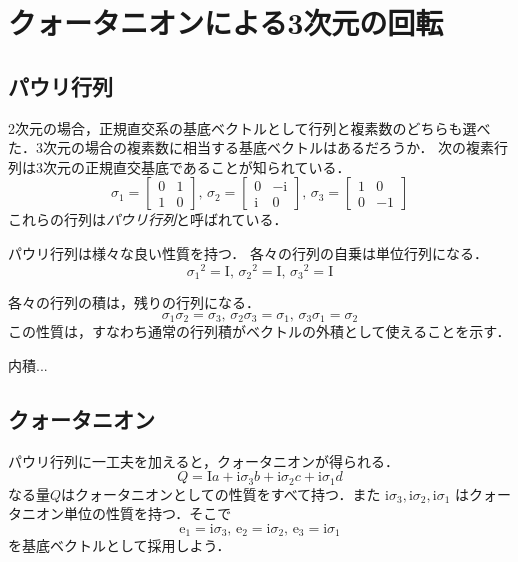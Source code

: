 \documentclass{jsbook}
\newcommand{\keyword}[1]{\emph{#1}}
\newcommand{\One}{\mathrm{I}}%
\newcommand{\im}{\mathrm{i}}%
\newcommand{\ve}{\mathrm{e}}
\begin{document}
\section{クォータニオンによる3次元の回転}

\subsection{パウリ行列}

2次元の場合，正規直交系の基底ベクトルとして行列と複素数のどちらも選べた．3次元の場合の複素数に相当する基底ベクトルはあるだろうか．
次の複素行列は3次元の正規直交基底であることが知られている．
\begin{equation}
\sigma_1=\begin{bmatrix}0&1\\1&0\end{bmatrix},\,
\sigma_2=\begin{bmatrix}0&-\im\\\im&0\end{bmatrix},\,
\sigma_3=\begin{bmatrix}1&0\\0&-1\end{bmatrix}
\end{equation}
これらの行列は\keyword{パウリ行列}と呼ばれている．

パウリ行列は様々な良い性質を持つ．
各々の行列の自乗は単位行列になる．
\begin{equation}
{\sigma_1}^2=\One,\,
{\sigma_2}^2=\One,\,
{\sigma_3}^2=\One
\end{equation}

各々の行列の積は，残りの行列になる．
\begin{equation}
\sigma_1\sigma_2=\sigma_3,\,
\sigma_2\sigma_3=\sigma_1,\,
\sigma_3\sigma_1=\sigma_2
\end{equation}
この性質は，すなわち通常の行列積がベクトルの外積として使えることを示す．

内積...

\subsection{クォータニオン}

パウリ行列に一工夫を加えると，クォータニオンが得られる．
\begin{equation}
Q=\One a+\im\sigma_3b+\im\sigma_2c+\im\sigma_1d
\end{equation}
なる量$Q$はクォータニオンとしての性質をすべて持つ．また $\im\sigma_3,\im\sigma_2,\im\sigma_1$ はクォータニオン単位の性質を持つ．そこで
\begin{equation}
\ve_1=\im\sigma_3,\,
\ve_2=\im\sigma_2,\,
\ve_3=\im\sigma_1
\end{equation}
を基底ベクトルとして採用しよう．
\end{document}
